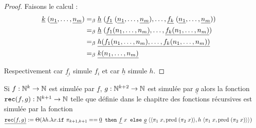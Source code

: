 \begin{proof}
    Faisons le calcul :
    \begin{align*}
        \underline k\;(\underline{n_1},\ldots,\underline{n_m}) &=_\beta \underline h\;(\underline{f_1}\;(\underline{n_1},\ldots,\underline{n_m}),\ldots,\underline{f_k}\;(\underline{n_1},\ldots,\underline{n_m}))\\
        &=_\beta \underline h\;(\underline{f_1(n_1,\ldots,n_m)},\ldots,\underline{f_k(n_1,\ldots,n_m)})\\
        &=_\beta \underline{h(f_1(n_1,\ldots,n_m),\ldots,f_k(n_1,\ldots,n_m))}\\
        &=_\beta \underline{k(n_1,\ldots,n_m)}
    \end{align*}

    Respectivement car $\underline{f_i}$ simule $f_i$ et car $\underline h$ simule $h$.
\end{proof}

\begin{prop}
    Si $f : \mathbb{N}^k\to\mathbb{N}$ est simulée par $\underline f$, $g : \mathbb{N}^{k+2}\to\mathbb{N}$ est simulée par $\underline g$ alors la fonction $\texttt{rec}(f,g) : \mathbb{N}^{k+1}\to\mathbb{N}$ telle que définie dans le chapitre des fonctions récursives est simulée par la fonction $$\underline{\texttt{rec}(f,g)} := \Theta(\lambda h.\lambda x.\texttt{if } \!\pi_{k+1,k+1} == \underline 0 \texttt{ then } \!\underline f\;x\texttt{ else }\!\underline g\;\langle \langle\pi_1\;x,\mathrm{pred}\;(\pi_2\;x)\rangle,h\;\langle \pi_1\;x,\mathrm{pred}\;(\pi_2\;x)\rangle\rangle) $$
\end{prop}

